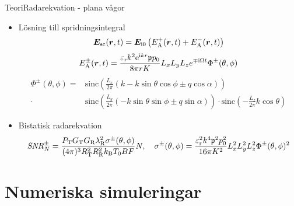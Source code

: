 \documentclass[11pt, final]{beamer}
\begin{document}
	\begin{frame}{Teori}{Radarekvation - plana vågor}
		\begin{itemize}
			\item Lösning till spridningsintegral
			\small
			\begin{equation*}
				\bm{E}_{\mathrm{sc}} (\bm{r},t) = \bm{E}_{\mathrm{i}0} \left( E_{\mathrm{A}}^+ (\bm{r},t) + E_{\mathrm{A}}^- (\bm{r},t) \right)
			\end{equation*}
			\begin{equation*}
				E_{\mathrm{A}}^\pm (\bm{r},t) = \frac{\varepsilon_{\mathrm{r}}k^2 \mathrm{e}^{\mathrm{i} kr} \mathfrak{p} p_0}{8\pi r K} L_{x} L_{y} L_{z} e^{\mp \mathrm{i} \Omega t} \Phi^\pm (\theta,\phi)
			\end{equation*}
			\pause
			\begin{equation*}
			\begin{split}
				\Phi^\pm(\theta,\phi) =& \text{sinc} \left( \frac{L_{x}}{2\pi} \left( k - k\sin{\theta}\cos{\phi} \pm q\cos{\alpha} \right) \right) \\
				\cdot& \text{sinc} \left( \frac{L_{y}}{2\pi} \left( -k\sin{\theta}\sin{\phi} \pm q\sin{\alpha} \right) \right)
				\cdot \text{sinc} \left( -\frac{L_{z}}{2\pi} k\cos{\theta} \right)
			\end{split}
			\end{equation*}
			\pause
			\normalsize
			\item Bistatisk radarekvation
			\small
			\begin{equation*}
				\mathit{SNR}^\pm_N = \frac{P_{\mathrm{T}} G_{\mathrm{T}} G_{\mathrm{R}} \lambda_{\mathrm{R}}^2 \sigma^\pm (\theta,\phi)}{(4\pi)^3 R_{\mathrm{T}}^2 R_{\mathrm{R}}^2 k_{\mathrm{B}} T_0 B F} N, \quad
				\sigma^\pm (\theta, \phi) = \frac{\varepsilon_{\mathrm{r}}^2 k^4 \mathfrak{p}^2 p_0^2}{16\pi K^2} L_{x}^2 L_{y}^2 L_{z}^2 \Phi^\pm (\theta,\phi)^2
			\end{equation*}
		\end{itemize}
	\end{frame}

	\section{Numeriska simuleringar}
	
\end{document}
